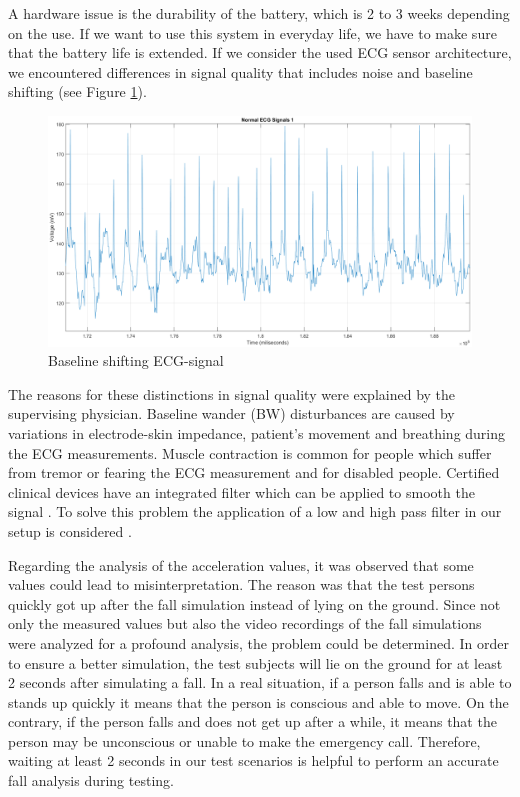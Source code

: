 \documentclass[10pt,journal,compsoc]{IEEEtran}
\begin{document}
A hardware issue is the durability of the battery, which is 2 to 3 weeks depending on the use. If we want to use this system in everyday life, we have to make sure that the battery life is extended. If we consider the used ECG sensor architecture, we encountered differences in signal quality that includes noise and baseline shifting (see Figure \ref{fig:ECGBaselineShifting}). 
\begin{figure}[!ht]
	\centering
	\includegraphics[scale=0.21]{Images/NormalECG1.eps}
	\caption[Measured ECG-signal]{Baseline shifting ECG-signal \cite{FatimaMasterThesis}}
	\label{fig:ECGBaselineShifting}
\end{figure}
The reasons for these distinctions in signal quality were explained by the supervising physician. Baseline wander (BW) disturbances are caused by variations in electrode-skin impedance, patient's movement and breathing during the ECG measurements. Muscle contraction is common for people which suffer from tremor or fearing the ECG measurement and for disabled people. Certified clinical devices have an integrated filter which can be applied to smooth the signal \cite{ECGNoise,DrNicoletteWagner}. To solve this problem the application of a low and high pass filter in our setup is considered \cite{FatimaMasterThesis}.

Regarding the analysis of the acceleration values, it was observed that some values could lead to misinterpretation. The reason was that the test persons quickly got up after the fall simulation instead of lying on the ground.
Since not only the measured values but also the video recordings of the fall simulations were analyzed for a profound analysis, the problem could be determined. In order to ensure a better simulation, the test subjects will lie on the ground for at least 2 seconds after simulating a fall. In a real situation, if a person falls and is able to stands up quickly it means that the person is conscious and able to move. On the contrary, if the person falls and does not get up after a while, it means that the person may be unconscious or unable to make the emergency call.  Therefore, waiting at least 2 seconds in our test scenarios is helpful to perform an accurate fall analysis during testing.
\end{document}
